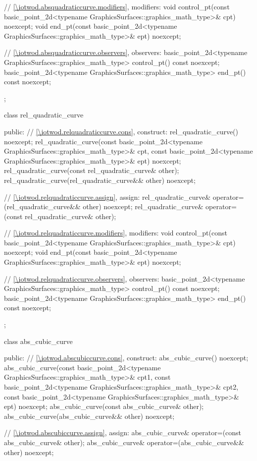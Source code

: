 \begin{codeblock}
{{{      // \ref{\iotwod.absquadraticcurve.modifiers}, modifiers:
      void control_pt(const basic_point_2d<typename
        GraphicsSurfaces::graphics_math_type>& cpt) noexcept;
      void end_pt(const basic_point_2d<typename
        GraphicsSurfaces::graphics_math_type>& ept) noexcept;

      // \ref{\iotwod.absquadraticcurve.observers}, observers:
      basic_point_2d<typename GraphicsSurfaces::graphics_math_type> control_pt() const noexcept;
      basic_point_2d<typename GraphicsSurfaces::graphics_math_type> end_pt() const noexcept;
    };

    class rel_quadratic_curve {
    public:
      // \ref{\iotwod.relquadraticcurve.cons}, construct:
      rel_quadratic_curve() noexcept;
      rel_quadratic_curve(const basic_point_2d<typename
        GraphicsSurfaces::graphics_math_type>& cpt, const basic_point_2d<typename
        GraphicsSurfaces::graphics_math_type>& ept) noexcept;
      rel_quadratic_curve(const rel_quadratic_curve& other);
      rel_quadratic_curve(rel_quadratic_curve&& other) noexcept;

      // \ref{\iotwod.relquadraticcurve.assign}, assign:
      rel_quadratic_curve& operator=(rel_quadratic_curve&& other) noexcept;
      rel_quadratic_curve& operator=(const rel_quadratic_curve& other);

      // \ref{\iotwod.relquadraticcurve.modifiers}, modifiers:
      void control_pt(const basic_point_2d<typename
        GraphicsSurfaces::graphics_math_type>& cpt) noexcept;
      void end_pt(const basic_point_2d<typename
        GraphicsSurfaces::graphics_math_type>& ept) noexcept;

      // \ref{\iotwod.relquadraticcurve.observers}, observers:
      basic_point_2d<typename GraphicsSurfaces::graphics_math_type> control_pt() const noexcept;
      basic_point_2d<typename GraphicsSurfaces::graphics_math_type> end_pt() const noexcept;
    };

    class abs_cubic_curve {
    public:
      // \ref{\iotwod.abscubiccurve.cons}, construct:
      abs_cubic_curve() noexcept;
      abs_cubic_curve(const basic_point_2d<typename GraphicsSurfaces::graphics_math_type>& cpt1,
        const basic_point_2d<typename GraphicsSurfaces::graphics_math_type>& cpt2,
        const basic_point_2d<typename GraphicsSurfaces::graphics_math_type>& ept) noexcept;
      abs_cubic_curve(const abs_cubic_curve& other);
      abs_cubic_curve(abs_cubic_curve&& other) noexcept;

      // \ref{\iotwod.abscubiccurve.assign}, assign:
      abs_cubic_curve& operator=(const abs_cubic_curve& other);
      abs_cubic_curve& operator=(abs_cubic_curve&& other) noexcept;

}}}
\end{codeblock}
